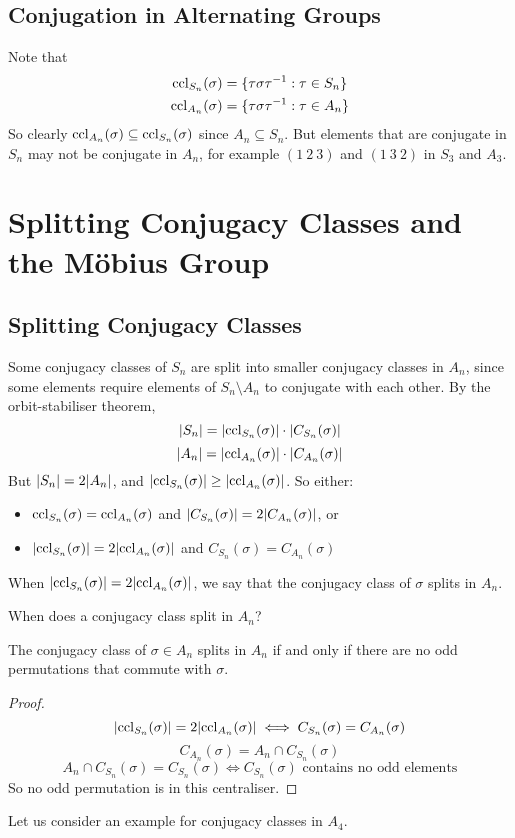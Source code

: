 \documentclass{article}
\begin{document}
	\subsection{Conjugation in Alternating Groups}
	Note that
	\begin{align*}
		\operatorname{ccl}_{S_n}(\sigma) &= \{ \tau \sigma \tau^{-1} : \tau \in S_n \} \\
		\operatorname{ccl}_{A_n}(\sigma) &= \{ \tau \sigma \tau^{-1} : \tau \in A_n \}
	\end{align*}
	So clearly $\operatorname{ccl}_{A_n}(\sigma) \subseteq \operatorname{ccl}_{S_n}(\sigma)$ since $A_n \subseteq S_n$. But elements that are conjugate in $S_n$ may not be conjugate in $A_n$, for example $(1\ 2\ 3)$ and $(1\ 3\ 2)$ in $S_3$ and $A_3$.

	\section{Splitting Conjugacy Classes and the M\"obius Group}
	\subsection{Splitting Conjugacy Classes}
	Some conjugacy classes of $S_n$ are split into smaller conjugacy classes in $A_n$, since some elements require elements of $S_n \setminus A_n$ to conjugate with each other. By the orbit-stabiliser theorem,
	\[ \abs{S_n} = \abs{\operatorname{ccl}_{S_n}(\sigma)} \cdot \abs{C_{S_n}(\sigma)} \]
	\[ \abs{A_n} = \abs{\operatorname{ccl}_{A_n}(\sigma)} \cdot \abs{C_{A_n}(\sigma)} \]
	But $\abs{S_n} = 2\abs{A_n}$, and $\abs{\operatorname{ccl}_{S_n}(\sigma)} \geq \abs{\operatorname{ccl}_{A_n}(\sigma)}$. So either:
	\begin{itemize}
		\item $\operatorname{ccl}_{S_n}(\sigma) = \operatorname{ccl}_{A_n}(\sigma)$ and $\abs{C_{S_n}(\sigma)} = 2\abs{C_{A_n}(\sigma)}$, or
		\item $\abs{\operatorname{ccl}_{S_n}(\sigma)} = 2 \abs{\operatorname{ccl}_{A_n}(\sigma)}$ and $C_{S_n}(\sigma) = C_{A_n}(\sigma)$
	\end{itemize}
	\begin{definition}
		When $\abs{\operatorname{ccl}_{S_n}(\sigma)} = 2 \abs{\operatorname{ccl}_{A_n}(\sigma)}$, we say that the conjugacy class of $\sigma$ splits in $A_n$.
	\end{definition}
	When does a conjugacy class split in $A_n$?
	\begin{proposition}
		The conjugacy class of $\sigma \in A_n$ splits in $A_n$ if and only if there are no odd permutations that commute with $\sigma$.
	\end{proposition}
	\begin{proof}
		\[ \abs{\operatorname{ccl}_{S_n}(\sigma)} = 2 \abs{\operatorname{ccl}_{A_n}(\sigma)} \iff C_{S_n}(\sigma) = C_{A_n}(\sigma) \]
		\[ C_{A_n}(\sigma) = A_n \cap C_{S_n}(\sigma) \]
		\[ A_n \cap C_{S_n}(\sigma) = C_{S_n}(\sigma) \iff C_{S_n}(\sigma)\text{ contains no odd elements} \]
		So no odd permutation is in this centraliser.
	\end{proof}
	Let us consider an example for conjugacy classes in $A_4$.\medskip
\end{document}
